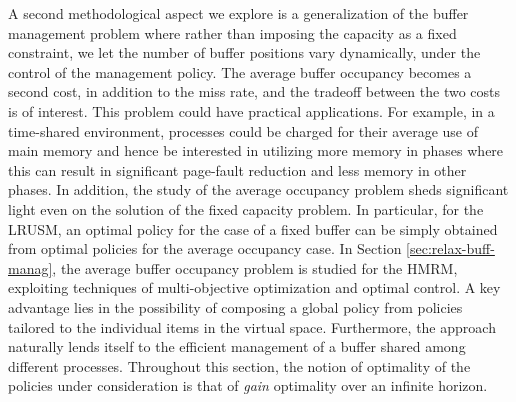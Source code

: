\documentclass[11pt,a4paper]{article}
\theoremstyle{definition}
\theoremstyle{remark}
\begin{document}
A second methodological aspect we explore is a generalization of the
buffer management problem where rather than imposing the capacity as a
fixed constraint, we let the number of buffer positions vary
dynamically, under the control of the management policy. The average
buffer occupancy becomes a second cost, in addition to the miss rate,
and the tradeoff between the two costs is of interest. This problem
could have practical applications. For example, in a time-shared
environment, processes could be charged for their average use of main
memory and hence be interested in utilizing more memory in phases
where this can result in significant page-fault reduction and less
memory in other phases. In addition, the study of the average
occupancy problem sheds significant light even on the solution of the
fixed capacity problem. In particular, for the LRUSM, an optimal
policy for the case of a fixed buffer can be simply obtained from
optimal policies for the average occupancy case. In Section
\ref{sec:relax-buff-manag}, the average buffer occupancy problem is
studied for the HMRM, exploiting techniques of multi-objective
optimization and optimal control. A key advantage lies in the possibility of composing a
global policy from policies tailored to the individual items in the
virtual space. Furthermore, the approach naturally lends itself to the
efficient management of a buffer shared among different processes.
Throughout this section, the notion of optimality of the policies
under consideration is that of \emph{gain} optimality over an infinite
horizon.
\end{document}

